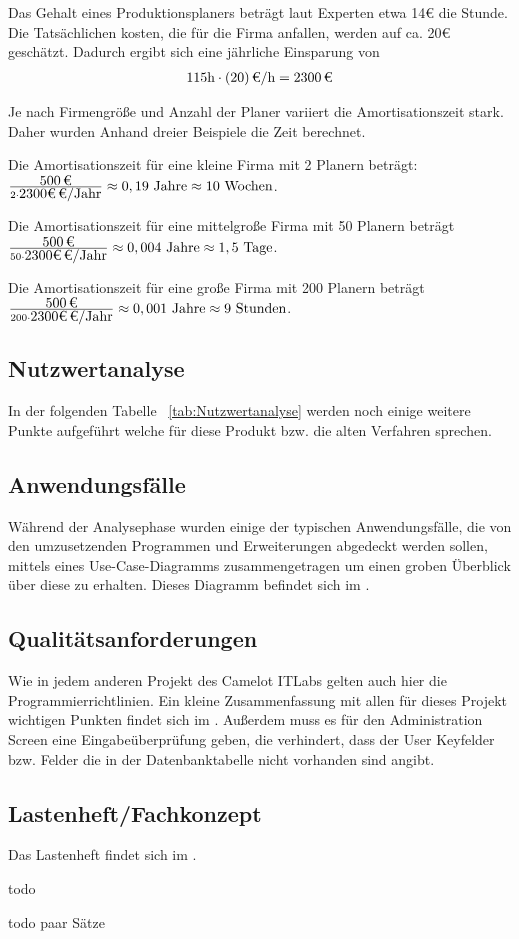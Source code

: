 Das Gehalt eines Produktionsplaners beträgt laut Experten etwa 14€ die Stunde. Die Tatsächlichen kosten, die für die Firma anfallen, werden auf ca. 20€ geschätzt.
Dadurch ergibt sich eine jährliche Einsparung von 
\begin{eqnarray}
115 \mbox{h} \cdot \eur{(20)}{\mbox{/h}} = \eur{2300}
\end{eqnarray}

Je nach Firmengröße und Anzahl der Planer variiert die Amortisationszeit stark. Daher wurden Anhand dreier Beispiele die Zeit berechnet.

Die Amortisationszeit für eine kleine Firma mit 2 Planern beträgt:
$\frac{\eur{500}}{2 \cdot \eur{2300€} \mbox{/Jahr} } \approx 0,19 \mbox{ Jahre} \approx 10 \mbox{ Wochen}$.

Die Amortisationszeit für eine mittelgroße Firma mit 50 Planern beträgt
$\frac{\eur{500}}{50 \cdot \eur{2300€} \mbox{/Jahr} } \approx 0,004 \mbox{ Jahre} \approx 1,5 \mbox{ Tage}$.

Die Amortisationszeit für eine große Firma mit 200 Planern beträgt
$\frac{\eur{500}}{200 \cdot \eur{2300€} \mbox{/Jahr} } \approx 0,001 \mbox{ Jahre} \approx 9 \mbox{ Stunden}$.

\subsection{Nutzwertanalyse}
\label{sec:Nutzwertanalyse}
In der folgenden Tabelle ~\ref{tab:Nutzwertanalyse} werden noch einige weitere Punkte aufgeführt welche für diese Produkt bzw. die alten Verfahren sprechen.


\subsection{Anwendungsfälle}
\label{sec:Anwendungsfaelle}
Während der Analysephase wurden einige der typischen Anwendungsfälle, die von den umzusetzenden Programmen und Erweiterungen abgedeckt werden sollen, mittels eines Use-Case-Diagramms zusammengetragen um einen groben Überblick über diese zu erhalten. Dieses Diagramm befindet sich im .

\subsection{Qualitätsanforderungen}
\label{sec:Qualitaetsanforderungen}
Wie in jedem anderen Projekt des Camelot ITLabs gelten auch hier die Programmierrichtlinien. Ein kleine Zusammenfassung mit allen für dieses Projekt wichtigen Punkten findet sich im . Außerdem muss es für den Administration Screen eine Eingabeüberprüfung geben, die verhindert, dass der User Keyfelder bzw. Felder die in der Datenbanktabelle nicht vorhanden sind angibt.

\subsection{Lastenheft/Fachkonzept}
\label{sec:Lastenheft}
Das Lastenheft findet sich im . 

todo


todo paar Sätze